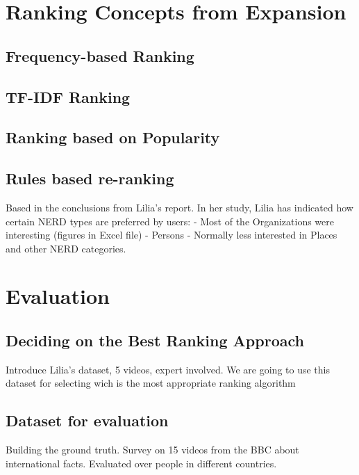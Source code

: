 \documentclass{llncs}
\begin{document}
\section{Ranking Concepts from Expansion}
\label{sec:Ranking}


\subsection{Frequency-based Ranking}

\subsection{TF-IDF  Ranking}

\subsection{Ranking based on Popularity}

\subsection{Rules based re-ranking}
Based in the conclusions from Lilia's report. In her study, Lilia has indicated how certain NERD types are preferred by users:
- Most of the Organizations were interesting (figures in Excel file)
- Persons 
- Normally less interested in Places and other NERD categories.



\section{Evaluation}
\label{sec:Evaluation}


\subsection{Deciding on the Best Ranking Approach}
\label{sec:decidingRanking}
Introduce Lilia's dataset, 5 videos, expert involved. We are going to use this dataset for selecting wich is the most appropriate ranking algorithm



\subsection{Dataset for evaluation}
Building the ground truth. Survey on 15 videos from the BBC about international facts. Evaluated over people in different countries.
\end{document}
